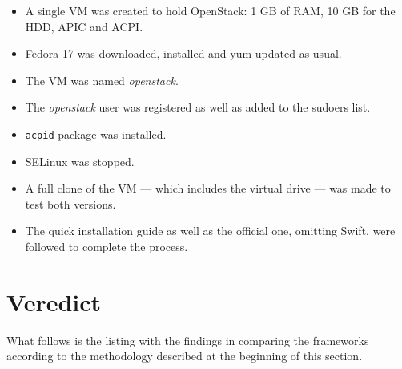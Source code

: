\begin{itemize}
 \item A single VM was created to hold OpenStack: 1 GB of RAM, 10 GB for the HDD, APIC and ACPI.
 \item Fedora 17 was downloaded, installed and yum-updated as usual.
 \item The VM was named \emph{openstack}.
 \item The \emph{openstack} user was registered as well as added to the sudoers list.
 \item \texttt{acpid} package was installed.
 \item SELinux was stopped.
 \item A full clone of the VM --- which includes the virtual drive --- was made to test both versions.
 \item The quick installation guide as well as the official one, omitting Swift, were followed to complete the process.
\end{itemize}

\section{Veredict}\label{sec:conclusiones}

\noindent What follows is the listing with the findings in comparing the frameworks according to the methodology described at the beginning of this section.
 
